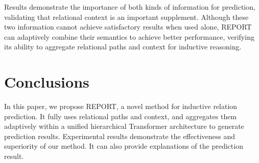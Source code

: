 \documentclass{article}
\begin{document}
Results demonstrate the importance of both kinds of information for prediction,
validating that relational context is an important supplement. 
Although these two information cannot achieve satisfactory results when used alone, REPORT can adaptively combine their semantics to achieve better performance, verifying its ability to aggregate relational paths and context for inductive reasoning.




\section{Conclusions}
In this paper, we propose REPORT, a novel method for inductive relation prediction.
It fully uses relational paths and context, 
and aggregates them adaptively within a unified hierarchical Transformer architecture to generate prediction results.
Experimental results demonstrate the effectiveness and superiority of our method.
It can also provide explanations of the prediction result.





\end{document}
